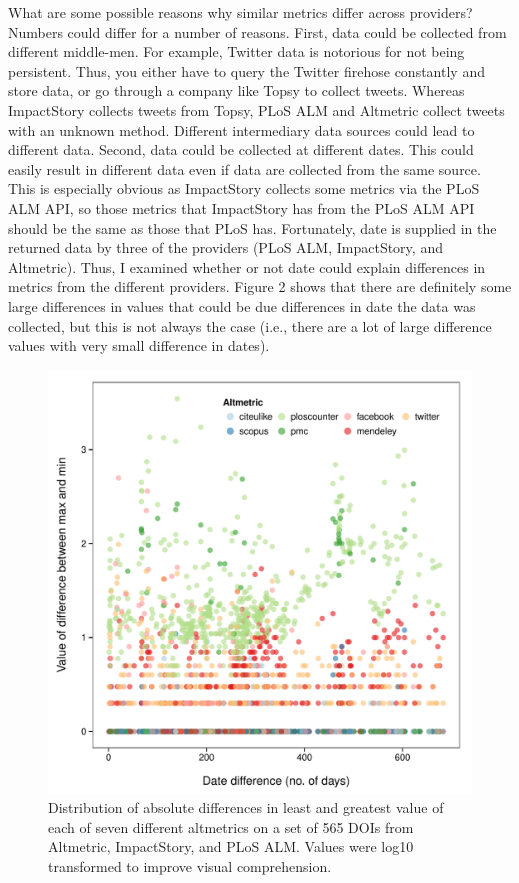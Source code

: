 \documentclass[letterpaper,superscriptaddress,showkeys,longbibliography]{revtex4-1}\usepackage{graphicx, color}
\newenvironment{knitrout}{}{} %
\begin{document}
What are some possible reasons why similar metrics differ across providers? Numbers could differ for a number of reasons. First, data could be collected from different middle-men. For example, Twitter data is notorious for not being persistent. Thus, you either have to query the Twitter firehose constantly and store data, or go through a company like Topsy to collect tweets. Whereas ImpactStory collects tweets from Topsy, PLoS ALM and Altmetric collect tweets with an unknown method. Different intermediary data sources could lead to different data. Second, data could be collected at different dates. This could easily result in different data even if data are collected from the same source. This is especially obvious as ImpactStory collects some metrics via the PLoS ALM API, so those metrics that ImpactStory has from the PLoS ALM API should be the same as those that PLoS has. Fortunately, date is supplied in the returned data by three of the providers (PLoS ALM, ImpactStory, and Altmetric). Thus, I examined whether or not date could explain differences in metrics from the different providers. Figure 2 shows that there are definitely some large differences in values that could be due differences in date the data was collected, but this is not always the case (i.e., there are a lot of large difference values with very small difference in dates). 

\begin{knitrout}
\color{fgcolor}\begin{figure}[]


{\centering \includegraphics[width=.7\linewidth]{figure/dataconst_plot2} 

}

\caption[Distribution of absolute differences in least and greatest value of each of seven different altmetrics on a set of 565 DOIs from Altmetric, ImpactStory, and PLoS ALM]{Distribution of absolute differences in least and greatest value of each of seven different altmetrics on a set of 565 DOIs from Altmetric, ImpactStory, and PLoS ALM. Values were log10 transformed to improve visual comprehension.\label{fig:dataconst_plot2}}
\end{figure}


\end{knitrout}
\end{document}
